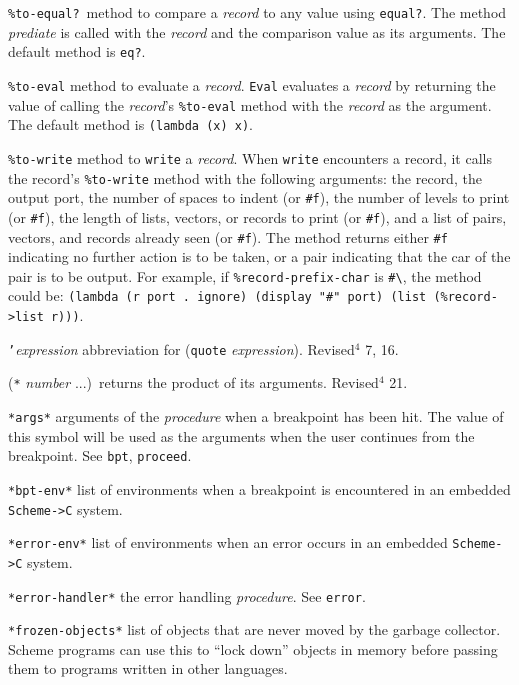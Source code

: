 \documentclass[10pt,twocolumn]{article}
\begin{document}
\texttt{\%to-equal?}\ method to compare a \emph{record} to any value
using \texttt{equal?}.  The method \emph{prediate} is called with the
\emph{record} and the comparison value as its arguments.  The
default method is \texttt{eq?}. 

\texttt{\%to-eval} method to evaluate a \emph{record}.  \texttt{Eval}
evaluates a \emph{record} by returning the value of calling the
\emph{record}'s \texttt{\%to-eval} method with the \emph{record} as the
argument.  The default method is \texttt{(lambda (x) x)}.

\texttt{\%to-write} method to \texttt{write} a \emph{record}.  When
\texttt{write} encounters a record, it calls the record's
\texttt{\%to-write} method with the following arguments:  the
record, the output port, the number of spaces to indent (or
\texttt{\#f}), the number of levels to print (or \texttt{\#f}), the length
of lists, vectors, or records to print (or \texttt{\#f}), and a list
of pairs, vectors, and records already seen (or \texttt{\#f}).  The
method returns either \texttt{\#f} indicating no further action is
to be taken, or a pair indicating that the car of the pair is
to be output.  For example, if \texttt{\%record-prefix-char} is
\texttt{\#\textbackslash\texttildelow}, the method could be: \texttt{(lambda (r port .\ ignore)
(display "\#\texttildelow" port) (list (\%record->list r)))}.

\texttt{'}\emph{expression} abbreviation for (\texttt{quote} \emph{expression}).  Revised$^4$
7, 16.

(\texttt{*} \emph{number} ...)\ returns the product of its arguments.
Revised$^4$ 21.

\texttt{*args*} arguments of the \emph{procedure} when a breakpoint has been
hit.  The value of this symbol will be used as the arguments when the
user continues from the breakpoint.  See \texttt{bpt}, \texttt{proceed}.

\texttt{*bpt-env*} list of environments when a breakpoint is encountered
in an embedded \texttt{Scheme->C} system.

\texttt{*error-env*} list of environments when an error occurs in an
embedded \texttt{Scheme->C} system.

\texttt{*error-handler*} the error handling \emph{procedure}.  See \texttt{error}.

\texttt{*frozen-objects*} list of objects that are never moved by the
garbage collector.  Scheme programs can use this to ``lock down'' objects
in memory before passing them to programs written in other languages.
\end{document}
